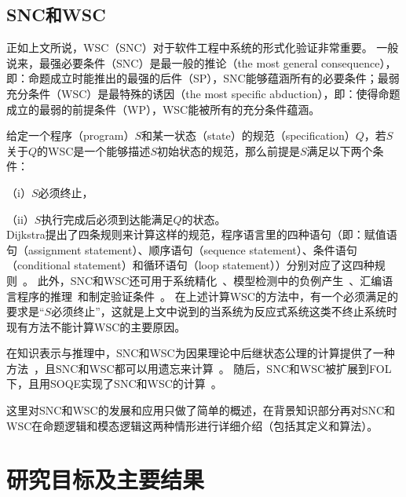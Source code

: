 \subsection{SNC和WSC}


正如上文所说，WSC（SNC）对于软件工程中系统的形式化验证非常重要。
一般说来，最强必要条件（SNC）是最一般的推论（the most general consequence），即：命题成立时能推出的最强的后件（SP），SNC能够蕴涵所有的必要条件；最弱充分条件（WSC）是最特殊的诱因（the most specific abduction），即：使得命题成立的最弱的前提条件（WP），WSC能被所有的充分条件蕴涵。

给定一个程序（program）$S$和某一状态（state）的规范（specification）$Q$，若$S$关于$Q$的WSC是一个能够描述$S$初始状态的规范，那么前提是$S$满足以下两个条件：

（i）$S$必须终止，

（ii）$S$执行完成后必须到达能满足$Q$的状态。\\
Dijkstra提出了四条规则来计算这样的规范，程序语言里的四种语句（即：赋值语句（assignment statement）、顺序语句（sequence statement）、条件语句（conditional statement）和循环语句（loop statement））分别对应了这四种规则~\cite{DBLP:journals/cacm/Dijkstra75}。
此外，SNC和WSC还可用于系统精化~\cite{woodcock1990refinement}、模型检测中的负例产生~\cite{dailler2018instrumenting}、汇编语言程序的推理~\cite{legato2002weakest}和制定验证条件~\cite{DBLP:journals/ipl/Leino05}。
在上述计算WSC的方法中，有一个必须满足的要求是“$S$必须终止”，这就是上文中说到的当系统为反应式系统这类不终止系统时现有方法不能计算WSC的主要原因。


在知识表示与推理中，SNC和WSC为因果理论中后继状态公理的计算提供了一种方法~\cite{DBLP:journals/jair/Lin03}，且SNC和WSC都可以用遗忘来计算~\cite{DBLP:journals/ai/Lin01,DBLP:conf/ijcai/DohertyLS01}。
随后，SNC和WSC被扩展到FOL下，且用SOQE实现了SNC和WSC的计算~\cite{DBLP:conf/ijcai/DohertyLS01}。

这里对SNC和WSC的发展和应用只做了简单的概述，在背景知识部分再对SNC和WSC在命题逻辑和模态逻辑这两种情形进行详细介绍（包括其定义和算法）。






\section{研究目标及主要结果}

